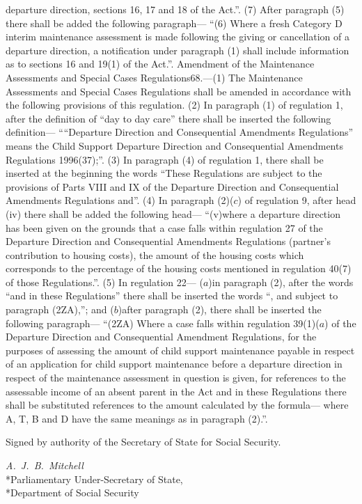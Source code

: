 \documentclass[a4paper]{article}
\begin{document}
departure direction, sections 16, 17 and 18 of the Act.”.
(7) After paragraph (5) there shall be added the following paragraph—
“(6) Where a fresh Category D interim maintenance assessment is made following
the giving or cancellation of a departure direction, a notification under
paragraph (1) shall include information as to sections 16 and 19(1) of the
Act.”.
Amendment of the Maintenance Assessments and Special Cases Regulations68.—(1)
The Maintenance Assessments and Special Cases Regulations shall be amended in
accordance with the following provisions of this regulation.
(2) In paragraph (1) of regulation 1, after the definition of “day to day care”
there shall be inserted the following definition—
““Departure Direction and Consequential Amendments Regulations” means the Child
Support Departure Direction and Consequential Amendments Regulations 1996(37);”.
(3) In paragraph (4) of regulation 1, there shall be inserted at the beginning
the words “These Regulations are subject to the provisions of Parts VIII and IX
of the Departure Direction and Consequential Amendments Regulations and”.
(4) In paragraph (2)($c$) of regulation 9, after head (iv) there shall be added
the following head—
“(v)where a departure direction has been given on the grounds that a case falls
within regulation 27 of the Departure Direction and Consequential Amendments
Regulations (partner’s contribution to housing costs), the amount of the housing
costs which corresponds to the percentage of the housing costs mentioned in
regulation 40(7) of those Regulations.”.
(5) In regulation 22—
($a$)in paragraph (2), after the words “and in these Regulations” there shall be
inserted the words “, and subject to paragraph (2ZA),”; and
($b$)after paragraph (2), there shall be inserted the following paragraph—
“(2ZA) Where a case falls within regulation 39(1)($a$) of the Departure Direction
and Consequential Amendment Regulations, for the purposes of assessing the
amount of child support maintenance payable in respect of an application for
child support maintenance before a departure direction in respect of the
maintenance assessment in question is given, for references to the assessable
income of an absent parent in the Act and in these Regulations there shall be
substituted references to the amount calculated by the formula—
where A, T, B and D have the same meanings as in paragraph (2).”.

\bigskip

Signed by authority of the Secretary of State for Social Security.

{\raggedleft
\emph{A.\ J.\ B.\ Mitchell}\\*Parliamentary Under-Secretary of
State,\\*Department of Social Security

}
\end{document}
